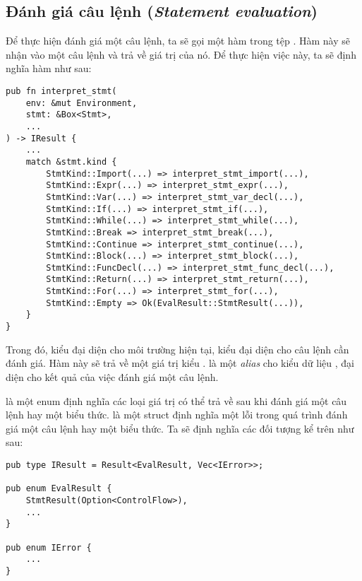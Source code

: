 \subsection{Đánh giá câu lệnh (\textit{Statement evaluation})}

    Để thực hiện đánh giá một câu lệnh, ta sẽ gọi một hàm  trong tệp . Hàm này sẽ nhận vào một câu lệnh và trả về giá trị của nó. Để thực hiện việc này, ta sẽ định nghĩa hàm  như sau:

\begin{lstlisting}[]
pub fn interpret_stmt(
    env: &mut Environment,
    stmt: &Box<Stmt>,
    ...
) -> IResult {
    ...
    match &stmt.kind {
        StmtKind::Import(...) => interpret_stmt_import(...),
        StmtKind::Expr(...) => interpret_stmt_expr(...),
        StmtKind::Var(...) => interpret_stmt_var_decl(...),
        StmtKind::If(...) => interpret_stmt_if(...),
        StmtKind::While(...) => interpret_stmt_while(...),
        StmtKind::Break => interpret_stmt_break(...),
        StmtKind::Continue => interpret_stmt_continue(...),
        StmtKind::Block(...) => interpret_stmt_block(...),
        StmtKind::FuncDecl(...) => interpret_stmt_func_decl(...),
        StmtKind::Return(...) => interpret_stmt_return(...),
        StmtKind::For(...) => interpret_stmt_for(...),
        StmtKind::Empty => Ok(EvalResult::StmtResult(...)),
    }
}
\end{lstlisting}

    Trong đó,  kiểu  đại diện cho môi trường hiện tại,  kiểu  đại diện cho câu lệnh cần đánh giá. Hàm này sẽ trả về một giá trị kiểu .  là một \textit{alias} cho kiểu dữ liệu  \kw{>}, đại diện cho kết quả của việc đánh giá một câu lệnh. 

     là một enum định nghĩa các loại giá trị có thể trả về sau khi đánh giá một câu lệnh hay một biểu thức.  là một struct định nghĩa một lỗi trong quá trình đánh giá một câu lệnh hay một biểu thức. Ta sẽ định nghĩa các đối tượng kể trên như sau:

\begin{lstlisting}[]
pub type IResult = Result<EvalResult, Vec<IError>>;

pub enum EvalResult {
    StmtResult(Option<ControlFlow>),
    ...
}

pub enum IError {
    ...
}
\end{lstlisting}

